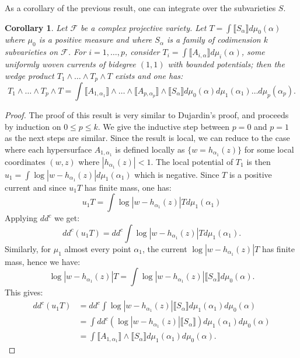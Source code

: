\documentclass[12pt]{amsbook}%
\newtheorem{cor}[thm]{Corollary}
\theoremstyle{definition}
\theoremstyle{remark}
\numberwithin{section}{chapter}
\numberwithin{subsection}{section}
\numberwithin{figure}{chapter}
\newcommand\intcur[1]{\llbracket #1 \rrbracket}
\def\cF{{\mathscr{F}}}
\begin{document}
{{  As a corollary of the previous result, one can integrate over the subvarieties $S$. 
  
  \begin{cor}\label{cor_intersection_woven}Let $\cF$  be a complex projective variety.  Let $T = \int \intcur{S_\alpha} d\mu_0(\alpha)$ where $\mu_0$ is a positive measure and where $S_\alpha$ is a family of codimension $k$ subvarieties on $\cF$. For $i=1, \ldots, p$, consider $T_i = \int \intcur{A_{i,\alpha}} d\mu_i(\alpha)$, some uniformly woven currents of bidegree $(1,1)$ with  bounded potentials; then the wedge product $T_1 \wedge \ldots \wedge T_p \wedge T$ exists and one has: 
  \begin{equation}
  T_1 \wedge \ldots \wedge T_p \wedge T = \int \intcur{A_{1,\alpha_1}}\wedge \ldots \wedge  \intcur{A_{p,\alpha_p}} \wedge\intcur{S_\alpha} d\mu_0(\alpha) d\mu_1(\alpha_1) \ldots d\mu_p(\alpha_p).
  \end{equation}
  \end{cor}
  
\begin{proof} The proof of this result is very similar to Dujardin's proof, and proceeds by induction on 
  $0 \leqslant p \leqslant  k $.
  We give the inductive step between $p=0$ and $p=1$ as the next steps are similar. 
Since the result is local, we can reduce to the case where each hypersurface $A_{1,\alpha_1}$ is defined locally as $\{ w = h_{\alpha_1}(z)\}$ for some local coordinates $(w,z)$ where $|h_{\alpha_1} (z)|< 1$.
The local potential of $T_1$ is then $u_1 = \int \log |w - h_{\alpha_1}(z)| d\mu_1(\alpha_1)$ which is negative.  
Since $T$ is a positive current and since $ u_1 T$ has finite mass, one has: 
\begin{equation*}
u_1 T = \int \log |w - h_{\alpha_1}(z)| T d\mu_1(\alpha_1)
\end{equation*}
Applying $dd^c$ we get: 
\begin{equation*}
dd^c (u_1 T) = dd^c \int \log |w - h_{\alpha_1}(z)| T d\mu_1(\alpha_1).  
\end{equation*}
Similarly, for $\mu_1$ almost every point $\alpha_1$, the current $ \log |w-h_{\alpha_1}(z)| T$ has finite mass, hence we have: 
\begin{equation*}
\log |w- h_{\alpha_1}(z)| T = \int \log |w- h_{\alpha_1}(z)| \intcur{S_\alpha} d\mu_0(\alpha).
\end{equation*}
 This gives: 
 \begin{align*}
 dd^c (u_1 T) &=  dd^c \int \log |w - h_{\alpha_1}(z)| \intcur{S_\alpha}  d\mu_1(\alpha_1) d\mu_0(\alpha) \\
 & = \int dd^c (\log |w - h_{\alpha_1}(z)| \intcur{S_\alpha}) d\mu_1(\alpha_1) d\mu_0(\alpha)\\
 & =   \int \intcur{ A_{1,\alpha_1}} \wedge \intcur{S_{\alpha}} d\mu_1(\alpha_1) d\mu_0(\alpha).
 \end{align*}
\end{proof}  
  
}}
\end{document}

